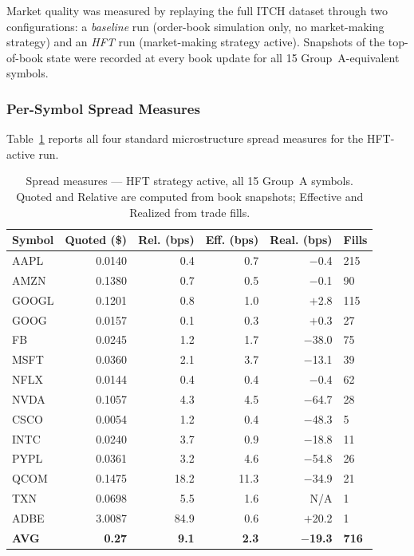 \documentclass[12pt]{article}
\begin{document}
Market quality was measured by replaying the full ITCH dataset through
two configurations: a \textit{baseline} run (order-book simulation only,
no market-making strategy) and an \textit{HFT} run (market-making
strategy active). Snapshots of the top-of-book state were recorded at
every book update for all 15 Group~A-equivalent symbols.

\subsubsection*{Per-Symbol Spread Measures}

Table~\ref{tab:spread_results} reports all four standard microstructure
spread measures for the HFT-active run.

\begin{table}[H]
\centering
\small
\caption{Spread measures — HFT strategy active, all 15 Group~A symbols.
         Quoted and Relative are computed from book snapshots;
         Effective and Realized from trade fills.}
\label{tab:spread_results}
\begin{tabular}{@{}lrrrrl@{}}
\toprule
\textbf{Symbol} & \textbf{Quoted (\$)} & \textbf{Rel. (bps)} & \textbf{Eff. (bps)} & \textbf{Real. (bps)} & \textbf{Fills} \\
\midrule
AAPL  & 0.0140 &  0.4 &  0.7 &  $-$0.4 & 215 \\
AMZN  & 0.1380 &  0.7 &  0.5 &  $-$0.1 &  90 \\
GOOGL & 0.1201 &  0.8 &  1.0 &  $+$2.8 & 115 \\
GOOG  & 0.0157 &  0.1 &  0.3 &  $+$0.3 &  27 \\
FB    & 0.0245 &  1.2 &  1.7 & $-$38.0 &  75 \\
MSFT  & 0.0360 &  2.1 &  3.7 & $-$13.1 &  39 \\
NFLX  & 0.0144 &  0.4 &  0.4 &  $-$0.4 &  62 \\
NVDA  & 0.1057 &  4.3 &  4.5 & $-$64.7 &  28 \\
CSCO  & 0.0054 &  1.2 &  0.4 & $-$48.3 &   5 \\
INTC  & 0.0240 &  3.7 &  0.9 & $-$18.8 &  11 \\
PYPL  & 0.0361 &  3.2 &  4.6 & $-$54.8 &  26 \\
QCOM  & 0.1475 & 18.2 & 11.3 & $-$34.9 &  21 \\
TXN   & 0.0698 &  5.5 &  1.6 &    N/A  &   1 \\
ADBE  & 3.0087 & 84.9 &  0.6 & $+$20.2 &   1 \\
\midrule
\textbf{AVG} & \textbf{0.27} & \textbf{9.1} & \textbf{2.3} & \textbf{$-$19.3} & \textbf{716} \\
\bottomrule
\end{tabular}
\end{table}
\end{document}
